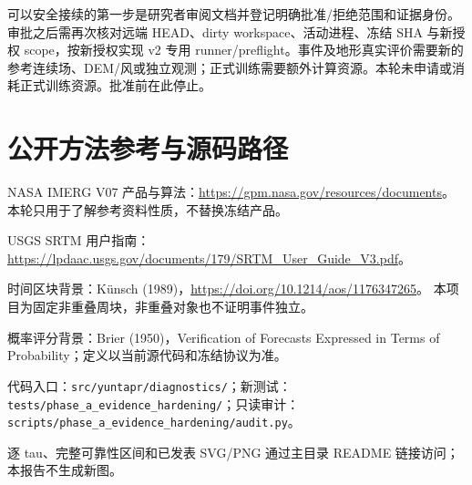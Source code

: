 \documentclass[UTF8,a4paper,10pt,fontset=fandol]{ctexart}
\begin{document}
可以安全接续的第一步是研究者审阅文档并登记明确批准/拒绝范围和证据身份。审批之后需再次核对远端 HEAD、dirty workspace、活动进程、冻结 SHA 与新授权 scope，按新授权实现 v2 专用 runner/preflight。事件及地形真实评价需要新的参考连续场、DEM/风或独立观测；正式训练需要额外计算资源。本轮未申请或消耗正式训练资源。批准前在此停止。\par\clearpage\section*{公开方法参考与源码路径}
NASA IMERG V07 产品与算法：\url{https://gpm.nasa.gov/resources/documents}。
本轮只用于了解参考资料性质，不替换冻结产品。
\par USGS SRTM 用户指南：\url{https://lpdaac.usgs.gov/documents/179/SRTM_User_Guide_V3.pdf}。
\par 时间区块背景：K\"unsch (1989)，\url{https://doi.org/10.1214/aos/1176347265}。
本项目为固定非重叠周块，非重叠对象也不证明事件独立。
\par 概率评分背景：Brier (1950)，Verification of Forecasts Expressed in Terms of Probability；定义以当前源代码和冻结协议为准。
\par 代码入口：\texttt{src/yuntapr/diagnostics/}；新测试：\texttt{tests/phase\_a\_evidence\_hardening/}；只读审计：\texttt{scripts/phase\_a\_evidence\_hardening/audit.py}。
\par 逐 tau、完整可靠性区间和已发表 SVG/PNG 通过主目录 README 链接访问；本报告不生成新图。
\end{document}
